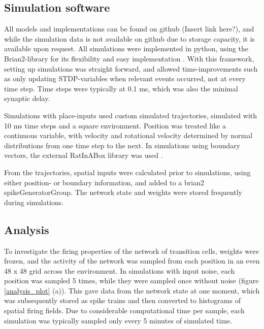 \documentclass{article}
\begin{document}
    \subsection{Simulation software} \label{Sim software}
    
    All models and implementations can be found on github (Insert link here?), and while the simulation data is not available on github due to storage capacity, it is available upon request. All simulations were implemented in python, using the Brian2-library for its flexibility and easy implementation \parencite{Brian2}. With this framework, setting up simulations was straight forward, and allowed time-improvements such as only updating STDP-variables when relevant events occurred, not at every time step. Time steps were typically at 0.1 ms, which was also the minimal synaptic delay.
    
    Simulations with place-inputs used custom simulated trajectories, simulated with 10 ms time steps and a square environment. Position was treated like a continuous variable, with velocity and rotational velocity determined by normal distributions from one time step to the next. In simulations using boundary vectors, the external RatInABox library was used \parencite{RatInABox}. 
    
    From the trajectories, spatial inputs were calculated prior to simulations, using either position- or boundary information, and added to a brian2 spikeGeneratorGroup. The network state and weights were stored frequently during simulations.

    \subsection{Analysis} \label{Analysis}
    To investigate the firing properties of the network of transition cells, weights were frozen, and the activity of the network was sampled from each position in an even 48 x 48 grid across the environment. In simulations with input noise, each position was sampled 5 times, while they were sampled once without noise (figure \ref{analysis_plot} (a)). This gave data from the network state at one moment, which was subsequently stored as spike trains and then converted to histograms of spatial firing fields. Due to considerable computational time per sample, each simulation was typically sampled only every 5 minutes of simulated time.
\end{document}
